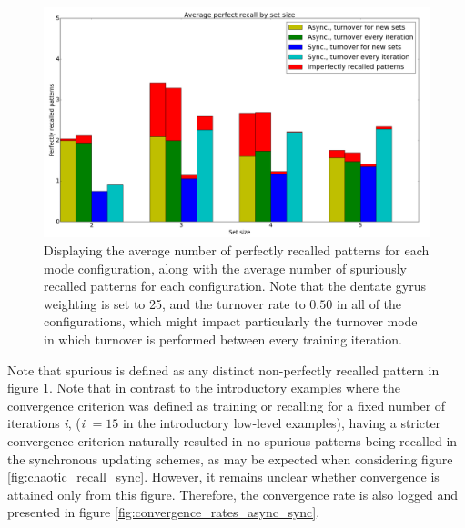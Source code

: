 
\begin{figure}
    \centering
    \includegraphics[width=12cm]{fig/cut_prr_with_spurious_reset_every_experiment}
    \caption{Displaying the average number of perfectly recalled patterns for each mode configuration, along with the average number of spuriously recalled patterns for each configuration. Note that the dentate gyrus weighting is set to 25, and the turnover rate to $0.50$ in all of the configurations, which might impact particularly the turnover mode in which turnover is performed between every training iteration.}
    \label{fig:avg_perfect_recall_rates_with_spurious_bars}
\end{figure}

Note that spurious is defined as any distinct non-perfectly recalled pattern in figure \ref{fig:avg_perfect_recall_rates_with_spurious_bars}. Note that in contrast to the introductory examples where the convergence criterion was defined as training or recalling for a fixed number of iterations \textit{i}, (\textit{i} $=15$ in the introductory low-level examples), having a stricter convergence criterion naturally resulted in no spurious patterns being recalled in the synchronous updating schemes, as may be expected when considering figure \ref{fig:chaotic_recall_sync}. However, it remains unclear whether convergence is attained only from this figure. Therefore, the convergence rate is also logged and presented in figure \ref{fig:convergence_rates_async_sync}.

